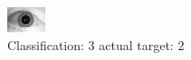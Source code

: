 \begin{figure}[h!]
\begin{center}
\includegraphics[width=0.60\columnwidth]{figures/ID1796_class_3_target_2.png}
\end{center}
\caption{ Classification: 3 actual target: 2}
\label{fig:ID1796_class_3_target_2}
\end{figure}
